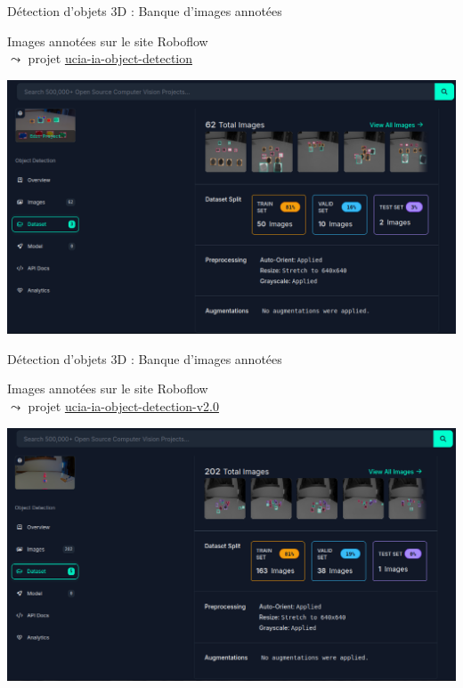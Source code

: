 \documentclass[11pt,serif,mathserif,compress,hyperref={colorlinks}]{beamer}
\begin{document}
\begin{frame}{Détection d'objets 3D : Banque d'images annotées}
  
  \begin{tcolorbox}[title=Annotation des images (v1)]
    {\small Images annotées sur le site Roboflow \\
      $\leadsto$ projet \href{https://universe.roboflow.com/ucia/ucia-ia-object-detection}{ucia-ia-object-detection}
    }
    
     \medskip\includegraphics[width=.9\textwidth]{images/Roboflow_datasets_v1_dark.png}
    
  \end{tcolorbox}

\end{frame}

\begin{frame}{Détection d'objets 3D : Banque d'images annotées}
  
  \begin{tcolorbox}[title=Annotation des images (v2)]
    {\small Images annotées sur le site Roboflow\\
      $\leadsto$ projet \href{https://universe.roboflow.com/ucia/ucia-ia-object-detection-v2.0/dataset/3}{ucia-ia-object-detection-v2.0}
    }
    
     \medskip\includegraphics[width=.9\textwidth]{images/Roboflow_datasets_v2_dark.png}
    
  \end{tcolorbox}

\end{frame}
\end{document}
